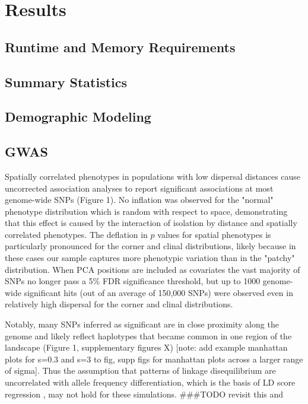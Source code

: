 \documentclass[9pt,twocolumn,twoside,lineno]{gsajnl}
\begin{document}
\section{Results}

\subsection{Runtime and Memory Requirements}

\subsection{Summary Statistics}

\subsection{Demographic Modeling}

\subsection{GWAS}
Spatially correlated phenotypes in populations with low dispersal distances cause uncorrected association analyses to report significant associations at most genome-wide SNPs (Figure 1). No inflation was observed for the "normal" phenotype distribution which is random with respect to space, demonstrating that this effect is caused by the interaction of isolation by distance and spatially correlated phenotypes. The deflation in $p$ values for spatial phenotypes is particularly pronounced for the corner and clinal distributions, likely because in these cases our sample captures more phenotypic variation than in the "patchy" distribution. When PCA positions are included as covariates the vast majority of SNPs no longer pass a 5\% FDR significance threshold, but up to 1000 genome-wide significant hits (out of an average of 150,000 SNPs) were observed even in relatively high dispersal for the corner and clinal distributions. 

Notably, many SNPs inferred as significant are in close proximity along the genome and likely reflect haplotypes that became common in one region of the landscape (Figure 1, supplementary figures X) [note: add example manhattan plots for s=0.3 and s=3 to fig, supp figs for manhattan plots across a larger range of sigma]. Thus the assumption that patterns of linkage disequilibrium are uncorrelated with allele frequency differentiation, which is the basis of LD score regression \citep{Bulik-Sullivan2015}, may not hold for these simulations. ###TODO revisit this and 
\end{document}
